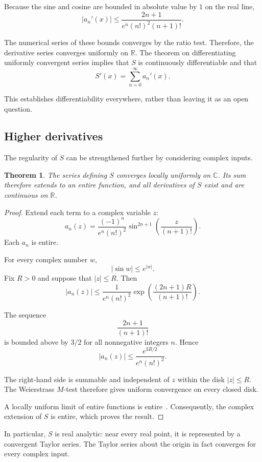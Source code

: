 \documentclass[12pt]{article}
\newtheorem{theorem}{Theorem}[section]
\theoremstyle{definition}
\theoremstyle{remark}
\begin{document}
Because the sine and cosine are bounded in absolute value
by \(1\) on the real line,
\[
|a_n'(x)|
\leq
\frac{2n+1}{e^n(n!)^2(n+1)!}.
\]

The numerical series of these bounds converges by the ratio
test. Therefore, the derivative series converges uniformly
on \(\mathbb{R}\). The theorem on differentiating uniformly
convergent series implies that \(S\) is continuously
differentiable and that
\[
S'(x)=\sum_{n=0}^{\infty}a_n'(x).
\]

This establishes differentiability everywhere, rather than
leaving it as an open question.

\subsection{Higher derivatives}

The regularity of \(S\) can be strengthened further by
considering complex inputs.

\begin{theorem}
The series defining \(S\) converges locally uniformly on
\(\mathbb{C}\). Its sum therefore extends to an entire
function, and all derivatives of \(S\) exist and are
continuous on \(\mathbb{R}\).
\end{theorem}

\begin{proof}
Extend each term to a complex variable \(z\):
\[
a_n(z)=
\frac{(-1)^n}{e^n(n!)^2}
\sin^{2n+1}\left(\frac{z}{(n+1)!}\right).
\]
Each \(a_n\) is entire.

For every complex number \(w\),
\[
|\sin w|\leq e^{|w|}.
\]
Fix \(R>0\) and suppose that \(|z|\leq R\). Then
\[
|a_n(z)|
\leq
\frac{1}{e^n(n!)^2}
\exp\left(\frac{(2n+1)R}{(n+1)!}\right).
\]

The sequence
\[
\frac{2n+1}{(n+1)!}
\]
is bounded above by \(3/2\) for all nonnegative integers
\(n\). Hence
\[
|a_n(z)|
\leq
\frac{e^{3R/2}}{e^n(n!)^2}.
\]

The right-hand side is summable and independent of \(z\)
within the disk \(|z|\leq R\). The Weierstrass \(M\)-test
therefore gives uniform convergence on every closed disk.

A locally uniform limit of entire functions is entire~\cite{conway}.
Consequently, the complex extension of \(S\) is entire,
which proves the result.
\end{proof}

In particular, \(S\) is real analytic: near every real
point, it is represented by a convergent Taylor series.
The Taylor series about the origin in fact converges for
every complex input.
\end{document}
